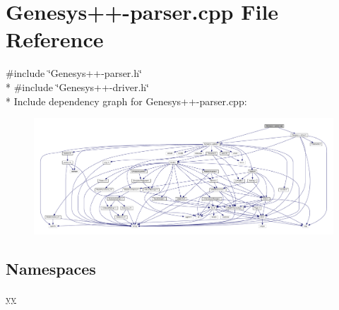 \hypertarget{_genesys_09_09-parser_8cpp}{\section{Genesys++-\/parser.cpp File Reference}
\label{_genesys_09_09-parser_8cpp}
}
{\ttfamily \#include \char`\"{}Genesys++-\/parser.\-h\char`\"{}}\\*
{\ttfamily \#include \char`\"{}Genesys++-\/driver.\-h\char`\"{}}\\*
Include dependency graph for Genesys++-\/parser.cpp\-:
\nopagebreak
\begin{figure}[H]
\begin{center}
\leavevmode
\includegraphics[width=350pt]{_genesys_09_09-parser_8cpp__incl}
\end{center}
\end{figure}
\subsection*{Namespaces}
\begin{DoxyCompactItemize}
\item 
\hyperlink{namespaceyy}{yy}
\end{DoxyCompactItemize}
